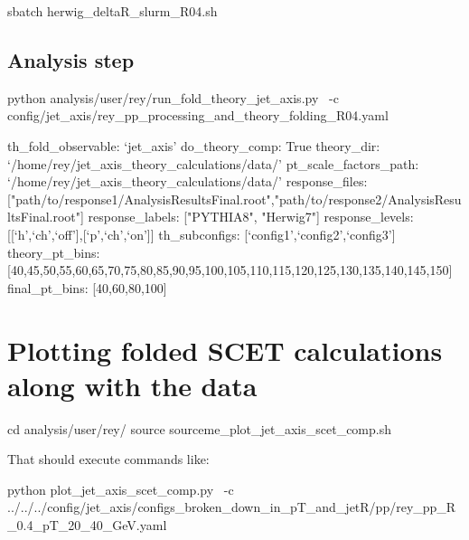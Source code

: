 \documentclass[12pt]{article}
\begin{document}
\begin{tcolorbox}
\begin{verbnobox}[\scriptsize]
sbatch herwig_deltaR_slurm_R04.sh
\end{verbnobox}  
\end{tcolorbox}

\subsection{Analysis step}

\begin{tcolorbox}
\begin{verbnobox}[\scriptsize]
python analysis/user/rey/run_fold_theory_jet_axis.py \
-c config/jet_axis/rey_pp_processing_and_theory_folding_R04.yaml
\end{verbnobox}  
\end{tcolorbox}

\begin{tcolorbox}
\begin{verbnobox}[\scriptsize]
th_fold_observable: `jet_axis'
do_theory_comp: True
theory_dir: `/home/rey/jet_axis_theory_calculations/data/'
pt_scale_factors_path: `/home/rey/jet_axis_theory_calculations/data/'
response_files: ["path/to/response1/AnalysisResultsFinal.root","path/to/response2/AnalysisResultsFinal.root"]
response_labels: ["PYTHIA8", "Herwig7"]
response_levels: [[`h',`ch',`off'],[`p',`ch',`on']]
th_subconfigs: [`config1',`config2',`config3']
theory_pt_bins: [40,45,50,55,60,65,70,75,80,85,90,95,100,105,110,115,120,125,130,135,140,145,150]
final_pt_bins: [40,60,80,100]
\end{verbnobox}  
\end{tcolorbox}

\section{Plotting folded SCET calculations along with the data}

\begin{tcolorbox}
\begin{verbnobox}[\scriptsize]
cd analysis/user/rey/
source sourceme_plot_jet_axis_scet_comp.sh
\end{verbnobox}  
\end{tcolorbox}

That should execute commands like:

\begin{tcolorbox}
\begin{verbnobox}[\scriptsize]
python plot_jet_axis_scet_comp.py \
-c ../../../config/jet_axis/configs_broken_down_in_pT_and_jetR/pp/rey_pp_R_0.4_pT_20_40_GeV.yaml
\end{verbnobox}  
\end{tcolorbox}
\end{document}
